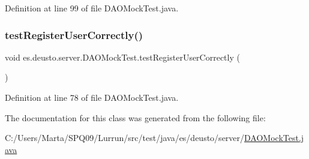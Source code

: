 Definition at line 99 of file D\+A\+O\+Mock\+Test.\+java.

\mbox{\label{classes_1_1deusto_1_1server_1_1_d_a_o_mock_test_a130e22cffc04eaf64f676f3bd990842e}} 
\subsubsection{\texorpdfstring{test\+Register\+User\+Correctly()}{testRegisterUserCorrectly()}}
{\footnotesize\ttfamily void es.\+deusto.\+server.\+D\+A\+O\+Mock\+Test.\+test\+Register\+User\+Correctly (\begin{DoxyParamCaption}{ }\end{DoxyParamCaption})}



Definition at line 78 of file D\+A\+O\+Mock\+Test.\+java.



The documentation for this class was generated from the following file\+:\begin{DoxyCompactItemize}
\item 
C\+:/\+Users/\+Marta/\+S\+P\+Q09/\+Lurrun/src/test/java/es/deusto/server/\hyperlink{_d_a_o_mock_test_8java}{D\+A\+O\+Mock\+Test.\+java}\end{DoxyCompactItemize}
